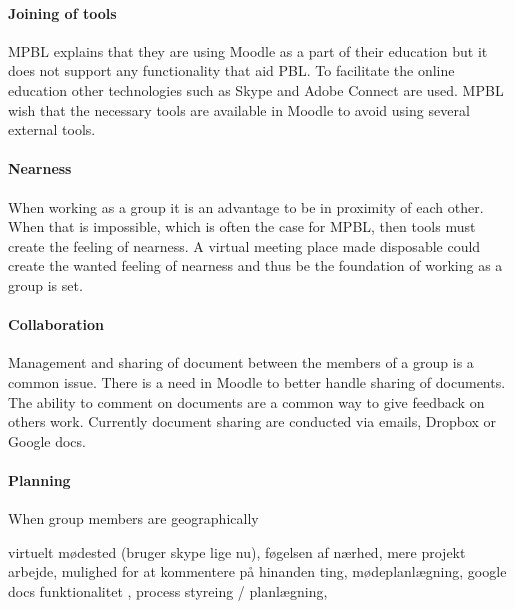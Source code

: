\paragraph{Joining of tools} MPBL explains that they are using Moodle as a part of their education but it does not support any functionality that aid PBL. 
To facilitate the online education other technologies such as Skype\cite{skype} and Adobe Connect\cite{adobe} are used. 
MPBL wish that the necessary tools are available in Moodle to avoid using several external tools.     

\paragraph{Nearness} When working as a group it is an advantage to be in proximity of each other. When that is impossible, which is often the case for MPBL, then tools must create the feeling of nearness. 
A virtual meeting place made disposable could create the wanted feeling of nearness and thus be the foundation of working as a group is set. 

\paragraph{Collaboration} Management and sharing of document between the members of a group is a common issue. 
There is a need in Moodle to better handle sharing of documents. The ability to comment on documents are a common way to give feedback on others work. 
Currently document sharing are conducted via emails, Dropbox\cite{dropbox} or Google docs\cite{googledocs}.


\paragraph{Planning} When group members are geographically 






virtuelt mødested (bruger skype lige nu), føgelsen af nærhed, mere projekt arbejde, mulighed for at kommentere på hinanden ting, mødeplanlægning, google docs funktionalitet , process styreing / planlægning, 


